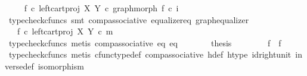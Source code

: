 \begin{isabellebody}
\ \isamarkupfalse%
\ {\isachardoublequoteopen}{\isachardot}{\kern0pt}{\isachardot}{\kern0pt}{\isachardot}{\kern0pt}\ {\isacharequal}{\kern0pt}\ {\isacharparenleft}{\kern0pt}f{}\ {\isasymcirc}\isactrlsub c\ left{\isacharunderscore}{\kern0pt}cart{\isacharunderscore}{\kern0pt}proj\ X\ Y{\isacharparenright}{\kern0pt}\ {\isasymcirc}\isactrlsub c\ graph{\isacharunderscore}{\kern0pt}morph\ f{}\ {\isasymcirc}\isactrlsub c\ i{}{\isachardoublequoteclose}\isanewline
\ \ \ \ \ \ \isamarkupfalse%
\ {\isacharparenleft}{\kern0pt}typecheck{\isacharunderscore}{\kern0pt}cfuncs{\isacharcomma}{\kern0pt}\ smt\ comp{\isacharunderscore}{\kern0pt}associative{}\ equalizer{\isacharunderscore}{\kern0pt}eq\ graph{\isacharunderscore}{\kern0pt}equalizer{}{\isacharparenright}{\kern0pt}\isanewline
\ \ \ \ \isamarkupfalse%
\ \isamarkupfalse%
\ {\isachardoublequoteopen}{\isachardot}{\kern0pt}{\isachardot}{\kern0pt}{\isachardot}{\kern0pt}\ {\isacharequal}{\kern0pt}\ f{}\ {\isasymcirc}\isactrlsub c\ left{\isacharunderscore}{\kern0pt}cart{\isacharunderscore}{\kern0pt}proj\ X\ Y\ {\isasymcirc}\isactrlsub c\ m{\isachardoublequoteclose}\isanewline
\ \ \ \ \ \ \isamarkupfalse%
\ {\isacharparenleft}{\kern0pt}typecheck{\isacharunderscore}{\kern0pt}cfuncs{\isacharcomma}{\kern0pt}\ metis\ comp{\isacharunderscore}{\kern0pt}associative{}\ eq{}\ eq{}{\isacharparenright}{\kern0pt}\isanewline
\ \ \ \ \isamarkupfalse%
\ \isamarkupfalse%
\ {\isacharquery}{\kern0pt}thesis\isacommand{{\isachardot}{\kern0pt}}\isamarkupfalse%
\isanewline
\ \ \isamarkupfalse%
\isanewline
\ \ \isamarkupfalse%
\ \isamarkupfalse%
\ {\isachardoublequoteopen}f{}\ {\isacharequal}{\kern0pt}\ f{}{\isachardoublequoteclose}\isanewline
\ \ \ \ \isamarkupfalse%
\ {\isacharparenleft}{\kern0pt}typecheck{\isacharunderscore}{\kern0pt}cfuncs{\isacharcomma}{\kern0pt}\ metis\ cfunc{\isacharunderscore}{\kern0pt}type{\isacharunderscore}{\kern0pt}def\ comp{\isacharunderscore}{\kern0pt}associative\ h{\isacharunderscore}{\kern0pt}def\ h{\isacharunderscore}{\kern0pt}type\ id{\isacharunderscore}{\kern0pt}right{\isacharunderscore}{\kern0pt}unit{}\ inverse{\isacharunderscore}{\kern0pt}def{}\ isomorphism{\isacharparenright}{\kern0pt}\isanewline
{}\isamarkupfalse%
%
\endisatagproof
{\isafoldproof}%
%
\isadelimproof
\isanewline
%
\endisadelimproof
%
\isadelimtheory
\isanewline
%
\endisadelimtheory
%
\isatagtheory
{}\isamarkupfalse%
%
\endisatagtheory
{\isafoldtheory}%
%
\isadelimtheory
%
\endisadelimtheory
%
\end{isabellebody}%
